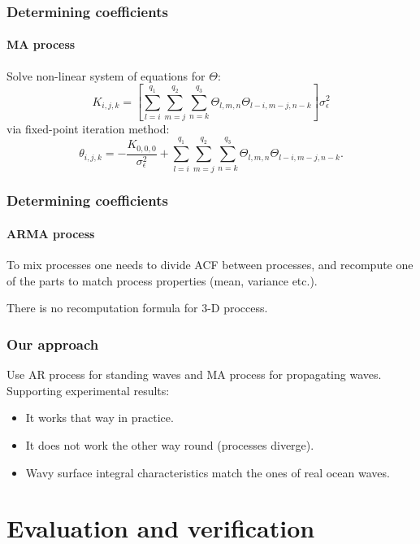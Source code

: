 \documentclass[14pt,aspectratio=169]{beamer}
\newcommand{\Var}[1]{\sigma_{#1}^2}
\begin{document}
	\begin{frame}
		\frametitle{Determining coefficients}
		\framesubtitle{MA process}
		\small%
		Solve non-linear system of equations for $\Theta$:
		\begin{equation*}
			K_{i,j,k} = 
			\left[
				\displaystyle
				\sum\limits_{l=i}^{q_1}
				\sum\limits_{m=j}^{q_2}
				\sum\limits_{n=k}^{q_3}
				\Theta_{l,m,n}\Theta_{l-i,m-j,n-k}
			\right]
			\Var{\epsilon}
		\end{equation*}
		via fixed-point iteration method:
		\begin{equation*}
			\theta_{i,j,k} =
				-\frac{K_{0,0,0}}{\Var{\epsilon}}
				+
				\sum\limits_{l=i}^{q_1}
				\sum\limits_{m=j}^{q_2}
				\sum\limits_{n=k}^{q_3}
				\Theta_{l,m,n} \Theta_{l-i,m-j,n-k}.
		\end{equation*}
	\end{frame}

	\begin{frame}
		\frametitle{Determining coefficients}
		\framesubtitle{ARMA process}
		To mix processes one needs to divide ACF between processes, and
		recompute one of the parts to match process properties (mean,
		variance etc.).
		\vfill%
		\begin{center}
			\alert{There is no recomputation formula for 3-D proccess.}
		\end{center}
	\end{frame}

	\begin{frame}
		\frametitle{Our approach}
		Use AR process for standing waves and MA process for
		propagating waves.
		\vfill%
		Supporting experimental results:
		\begin{itemize}
			\item It works that way in practice.
			\item It does not work the other way round
				  (processes diverge).
			\item Wavy surface integral characteristics 
				  match the ones of real ocean waves.
		\end{itemize}
	\end{frame}

	\section{Evaluation and verification}
\end{document}
